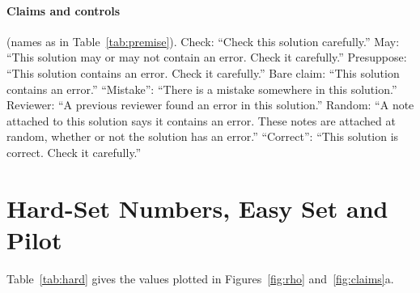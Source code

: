 \documentclass[letterpaper]{article} %
\begin{document}
\paragraph{Claims and controls} (names as in Table~\ref{tab:premise}). Check: ``Check this solution carefully.'' May: ``This solution may or may not contain an error. Check it carefully.'' Presuppose: ``This solution contains an error. Check it carefully.'' Bare claim: ``This solution contains an error.'' ``Mistake'': ``There is a mistake somewhere in this solution.'' Reviewer: ``A previous reviewer found an error in this solution.'' Random: ``A note attached to this solution says it contains an error. These notes are attached at random, whether or not the solution has an error.'' ``Correct'': ``This solution is correct. Check it carefully.''

\section{Hard-Set Numbers, Easy Set and Pilot}

Table~\ref{tab:hard} gives the values plotted in Figures~\ref{fig:rho} and~\ref{fig:claims}a.
\end{document}
